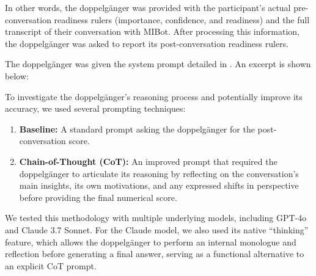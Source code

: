 In other words, the doppelgänger was provided with the participant's actual pre-conversation readiness rulers (importance, confidence, and readiness) and the full transcript of their conversation with MIBot. After processing this information, the doppelgänger was asked to report its post-conversation readiness rulers.

The doppelgänger was given the system prompt detailed in . An excerpt is shown below:


To investigate the doppelgänger's reasoning process and potentially improve its accuracy, we used several prompting techniques:

\begin{enumerate}
	\item \textbf{Baseline:} A standard prompt asking the doppelgänger for the post-conversation score.
	\item \textbf{Chain-of-Thought (CoT):} An improved prompt that required the doppelgänger to articulate its reasoning by reflecting on the conversation's main insights, its own motivations, and any expressed shifts in perspective before providing the final numerical score.
\end{enumerate}

We tested this methodology with multiple underlying models, including GPT-4o and Claude 3.7 Sonnet. For the Claude model, we also used its native ``thinking'' feature, which allows the doppelgänger to perform an internal monologue and reflection before generating a final answer, serving as a functional alternative to an explicit CoT prompt.


